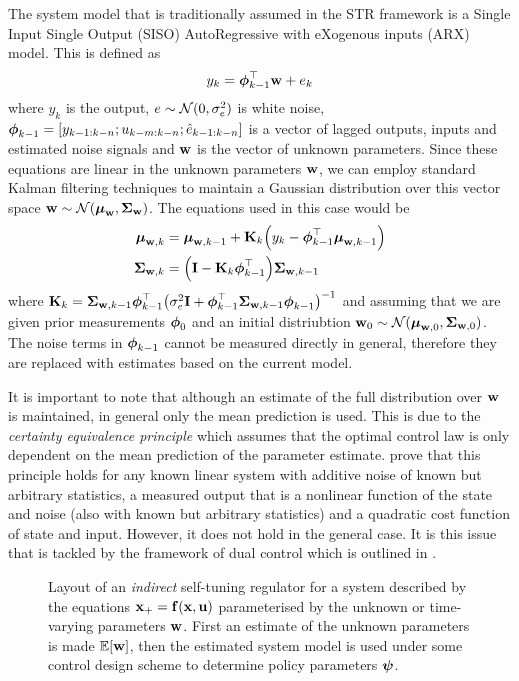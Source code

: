 The system model that is traditionally assumed in the STR framework is a Single Input Single Output (SISO) AutoRegressive with eXogenous inputs (ARX) model. This is defined as
\begin{equation*}
y_k = \boldsymbol{\phi}^\top_{k-1} \mathbf{w} + e_k
\end{equation*}
where $y_k$ is the output, $e \sim \mathcal{N}(0,\sigma_e^2)$ is white noise, $\boldsymbol{\phi}_{k-1} = [y_{k-1:k-n}; u_{k-m:k-n}; \hat e_{k-1:k-n}]$ is a vector of lagged outputs, inputs and estimated noise signals and $\mathbf{w}$ is the vector of unknown parameters. Since these equations are linear in the unknown parameters $\mathbf{w}$, we can employ standard Kalman filtering techniques to maintain a Gaussian distribution over this vector space $\mathbf{w} \sim \mathcal{N}(\boldsymbol{\mu}_{\mathbf{w}},\boldsymbol{\Sigma}_{\mathbf{w}})$. The equations used in this case would be
\begin{align*}
\boldsymbol{\mu}_{\mathbf{w}, k} &= \boldsymbol{\mu}_{\mathbf{w}, k-1} + \mathbf{K}_k \Big( y_k - \boldsymbol{\phi}^\top_{k-1} \boldsymbol{\mu}_{\mathbf{w}, k-1} \Big) \\
\boldsymbol{\Sigma}_{\mathbf{w}, k} &= \Big(\mathbf{I} - \mathbf{K}_k\boldsymbol{\phi}^\top_{k-1}\Big)\boldsymbol{\Sigma}_{\mathbf{w}, k-1}
\end{align*}
where $\mathbf{K}_k = \boldsymbol{\Sigma}_{\mathbf{w}, k-1}\boldsymbol{\phi}^\top_{k-1}\big( \sigma_e^2\mathbf{I} + \boldsymbol{\phi}^\top_{k-1} \boldsymbol{\Sigma}_{\mathbf{w}, k-1} \boldsymbol{\phi}_{k-1}\big)^{-1}$ and assuming that we are given  prior measurements $\boldsymbol{\phi}_0$ and an initial distriubtion $\mathbf{w}_0 \sim \mathcal{N}(\boldsymbol{\mu}_{\mathbf{w}, 0},\boldsymbol{\Sigma}_{\mathbf{w}, 0})$. The noise terms in $\boldsymbol{\phi}_{k-1}$ cannot be measured directly in general, therefore they are replaced with estimates based on the current model. 

It is important to note that although an estimate of the full distribution over $\mathbf{w}$ is maintained, in general only the mean prediction is used. This is due to the \textit{certainty equivalence principle} which assumes that the optimal control law is only dependent on the mean prediction of the parameter estimate.  \cite{TB75} prove that this principle holds for any known linear system with additive noise of known but arbitrary statistics, a measured output that is a nonlinear function of the state and noise (also with known but arbitrary statistics) and a quadratic cost function of state and input. However, it does not hold in the general case. It is this issue that is tackled by the framework of dual control which is outlined in .




\begin{figure}
\centering

\caption{Layout of an \textit{indirect} self-tuning regulator for a system described by the equations $\mathbf{x}_+ = \mathbf{f}(\mathbf{x},\mathbf{u})$ parameterised by the unknown or time-varying parameters $\mathbf{w}$. First an estimate of the unknown parameters is made $\mathbb{E}[\mathbf{w}]$, then the estimated system model is used under some control design scheme to determine policy parameters $\boldsymbol{\psi}$.}
\label{fig:STRfig}
\end{figure}


